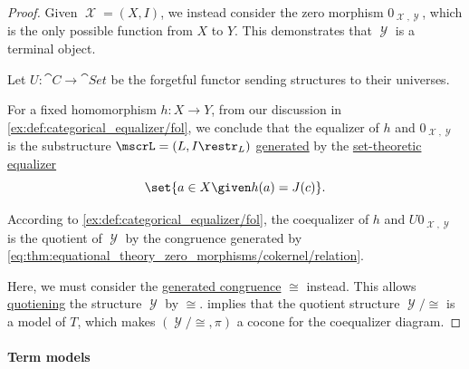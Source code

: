 \begin{proof}
  Given \( \mscrX = (X, I) \), we instead consider the zero morphism \( 0_{\mscrX, \mscrY} \), which is the only possible function from \( X \) to \( Y \). This demonstrates that \( \mscrY \) is a terminal object.

   Let \( U: \cat{C} \to \cat{Set} \) be the forgetful functor sending structures to their universes.

  For a fixed homomorphism \( h: X \to Y \), from our discussion in \cref{ex:def:categorical_equalizer/fol}, we conclude that the equalizer of \( h \) and \( 0_{\mscrX, \mscrY} \) is the substructure \( \mscrL = (L, I\restr_L) \) \hyperref[def:fol_generated_substructure]{generated} by the \hyperref[ex:def:categorical_equalizer/set]{set-theoretic equalizer}
  \begin{equation*}
    \set{ a \in X \given h(a) = J(c) }.
  \end{equation*}

   According to \cref{ex:def:categorical_equalizer/fol}, the coequalizer of \( h \) and \( U0_{\mscrX, \mscrY} \) is the quotient of \( \mscrY \) by the congruence generated by \eqref{eq:thm:equational_theory_zero_morphisms/cokernel/relation}.

  Here, we must consider the \hyperref[def:fol_generated_congruence]{generated congruence} \( {\cong} \) instead. This allows \hyperref[def:fol_quotient_structure]{quotiening} the structure \( \mscrY \) by \( {\cong} \).  implies that the quotient structure \( \mscrY / {\cong} \) is a model of \( T \), which makes \( (\mscrY / {\cong}, \pi) \) a cocone for the coequalizer diagram.
\end{proof}

\paragraph{Term models}

